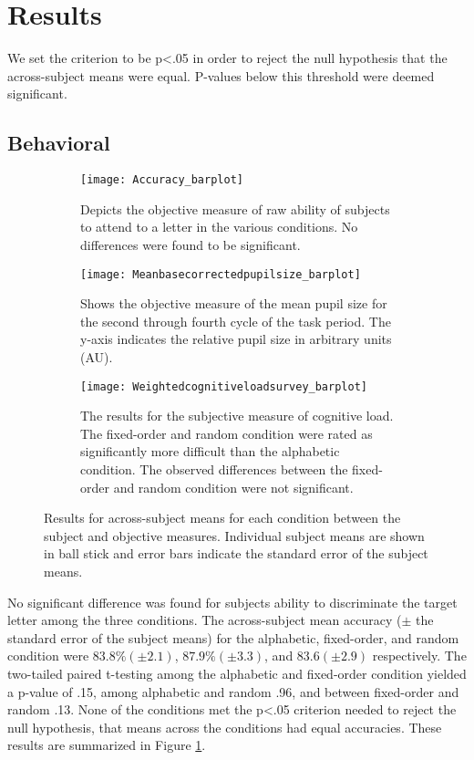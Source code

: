 \documentclass[10pt]{article}
\begin{document}
\section{Results}

We set the criterion to be p<.05 in order to reject the null
hypothesis that the across-subject means were equal. P-values
below this threshold were deemed significant.

\subsection{Behavioral}

\begin{figure}[t]
    \centering
    \begin{subfigure}[t]{.25\linewidth}
        \centering
      \texttt{[image: Accuracy\_barplot]}
      \caption{Depicts the objective measure of raw ability of subjects to attend
          to a letter in the various conditions.  No
          differences were found to be significant. }
      \label{accuracy}
    \end{subfigure}
    \qquad
    \begin{subfigure}[t]{.25\linewidth}
      \centering
      \texttt{[image: Meanbasecorrectedpupilsize\_barplot]}
      \caption{Shows the objective measure of the mean pupil size for the second
      through fourth cycle of the task period. The y-axis indicates the
  relative pupil size in arbitrary units (AU).} 
      \label{psBarplot}
    \end{subfigure}
    \qquad
    \begin{subfigure}[t]{.25\linewidth}
      \centering
      \texttt{[image: Weightedcognitiveloadsurvey\_barplot]}
      \caption{The results for the subjective measure of cognitive
  load.  The fixed-order and random condition were rated
  as significantly more difficult than the alphabetic
  condition. The observed differences between the fixed-order
  and random condition were not significant.}
      \label{cogLoad}
    \end{subfigure}
  \caption{Results for across-subject means for each condition
      between the subject and objective measures. Individual
  subject means are shown in ball stick and error bars
  indicate the standard error of the subject means.}
\end{figure}

No significant difference was found for subjects ability to
discriminate the target letter among the three conditions.
The across-subject mean accuracy ($\pm$ the standard error of
the subject means) for the alphabetic, fixed-order, and random
condition were $83.8 \% (\pm2.1)$, $87.9 \% (\pm3.3)$,
and $83.6 (\pm 2.9)$ respectively.  The two-tailed paired t-testing among 
the alphabetic and fixed-order condition yielded a p-value of .15,
among alphabetic and random .96, and between fixed-order and
random .13.  None of the conditions met the p<.05 criterion needed
to reject the null hypothesis, that means across the conditions had
equal accuracies. These results are summarized in Figure \ref{accuracy}.
\end{document}
